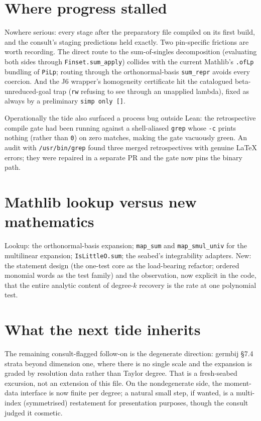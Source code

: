 \documentclass[11pt]{article}
\newcommand{\code}[1]{\texttt{#1}}
\begin{document}
\section{Where progress stalled}

Nowhere serious: every stage after the preparatory file compiled on
its first build, and the consult's staging predictions held exactly.
Two pin-specific frictions are worth recording. The direct route to
the sum-of-singles decomposition (evaluating both sides through
\code{Finset.sum\_apply}) collides with the current Mathlib's
\code{.ofLp} bundling of \code{PiLp}; routing through the
orthonormal-basis \code{sum\_repr} avoids every coercion. And the J6
wrapper's homogeneity certificate hit the catalogued
beta-unreduced-goal trap (\code{rw} refusing to see through an
unapplied lambda), fixed as always by a preliminary
\code{simp only []}.

Operationally the tide also surfaced a process bug outside Lean: the
retrospective compile gate had been running against a shell-aliased
\code{grep} whose \code{-c} prints nothing (rather than \code{0}) on
zero matches, making the gate vacuously green. An audit with
\code{/usr/bin/grep} found three merged retrospectives with genuine
LaTeX errors; they were repaired in a separate PR and the gate now
pins the binary path.

\section{Mathlib lookup versus new mathematics}

Lookup: the orthonormal-basis expansion; \code{map\_sum} and
\code{map\_smul\_univ} for the multilinear expansion;
\code{IsLittleO.sum}; the seabed's integrability adapters. New:
the statement design (the
one-test core as the load-bearing refactor; ordered monomial words as
the test family) and the observation, now explicit in the code, that
the entire analytic content of degree-$k$ recovery is the rate at one
polynomial test.

\section{What the next tide inherits}

The remaining consult-flagged follow-on is the degenerate direction:
germbij \S 7.4 strata beyond dimension one, where there is no single
scale and the expansion is graded by resolution data rather than
Taylor degree. That is a fresh-seabed excursion, not an extension of
this file. On the nondegenerate side, the moment-data interface is
now finite per degree; a natural small step, if wanted, is a
multi-index (symmetrised) restatement for presentation purposes,
though the consult judged it cosmetic.
\end{document}
